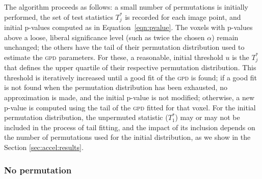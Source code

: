 The algorithm proceeds as follows: a small number of permutations is initially performed, the set of test statistics $T^*_j$ is recorded for each image point, and initial p-values computed as in Equation~\ref{eqn:pvalue}. The voxels with p-values above a loose, liberal significance level (such as twice the chosen $\alpha$) remain unchanged; the others have the tail of their permutation distribution used to estimate the \textsc{gpd} parameters. For these, a reasonable, initial threshold $u$ is the $T^*_j$ that defines the upper quartile of their respective permutation distribution. This threshold is iteratively increased until a good fit of the \textsc{gpd} is found; if a good fit is not found when the permutation distribution has been exhausted, no approximation is made, and the initial p-value is not modified; otherwise, a new p-value is computed using the tail of the \textsc{gpd} fitted for that voxel. For the initial permutation distribution, the unpermuted statistic ($T^*_1$) may or may not be included in the process of tail fitting, and the impact of its inclusion depends on the number of permutations used for the initial distribution, as we show in the Section \ref{sec:accel:results}.

\subsubsection{No permutation}

